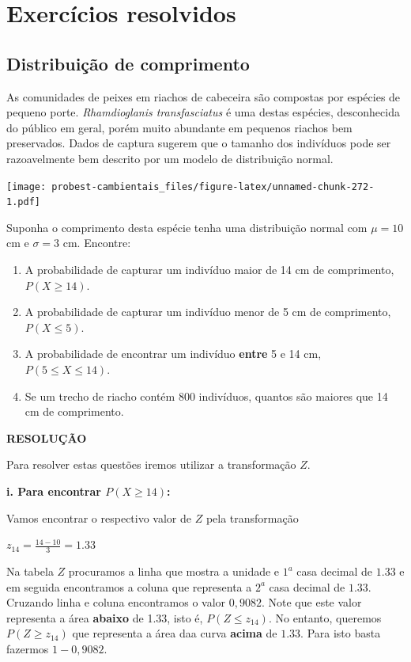 \documentclass[
]{book}
\providecommand{\tightlist}{%
  \setlength{\itemsep}{0pt}\setlength{\parskip}{0pt}}
\begin{document}
\hypertarget{exercuxedcios-resolvidos}{%
\section{Exercícios resolvidos}\label{exercuxedcios-resolvidos}}

\hypertarget{distribuiuxe7uxe3o-de-comprimento}{%
\subsection{Distribuição de comprimento}\label{distribuiuxe7uxe3o-de-comprimento}}

As comunidades de peixes em riachos de cabeceira são compostas por espécies de pequeno porte. \emph{Rhamdioglanis transfasciatus} é uma destas espécies, desconhecida do público em geral, porém muito abundante em pequenos riachos bem preservados. Dados de captura sugerem que o tamanho dos indivíduos pode ser razoavelmente bem descrito por um modelo de distribuição normal.

\texttt{[image: probest-cambientais\_files/figure-latex/unnamed-chunk-272-1.pdf]}

Suponha o comprimento desta espécie tenha uma distribuição normal com \(\mu = 10\) cm e \(\sigma = 3\) cm. Encontre:

\begin{enumerate}
\def\labelenumi{\roman{enumi}.}
\tightlist
\item
  A probabilidade de capturar um indivíduo maior de 14 cm de comprimento, \(P(X \ge 14)\).
\item
  A probabilidade de capturar um indivíduo menor de 5 cm de comprimento, \(P(X \le 5)\).
\item
  A probabilidade de encontrar um indivíduo \textbf{entre} 5 e 14 cm, \(P(5 \le X \le 14)\).
\item
  Se um trecho de riacho contém 800 indivíduos, quantos são maiores que 14 cm de comprimento.
\end{enumerate}

\textbf{RESOLUÇÃO}

Para resolver estas questões iremos utilizar a transformação \(Z\).

\textbf{i. Para encontrar \(P(X \ge 14)\):}

Vamos encontrar o respectivo valor de \(Z\) pela transformação

\(z_{14} = \frac{14 - 10}{3} = 1.33\)

Na tabela \(Z\) procuramos a linha que mostra a unidade e \(1^a\) casa decimal de \(1.33\) e em seguida encontramos a coluna que representa a \(2^a\) casa decimal de \(1.33\). Cruzando linha e coluna encontramos o valor \(0,9082\). Note que este valor representa a área \textbf{abaixo} de 1.33, isto é, \(P(Z \le z_{14})\). No entanto, queremos \(P(Z \ge z_{14})\) que representa a área daa curva \textbf{acima} de \(1.33\). Para isto basta fazermos \(1 - 0,9082\).
\end{document}

